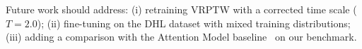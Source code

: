 \documentclass[conference]{IEEEtran}
\begin{document}
Future work should address: (i) retraining VRPTW with a corrected time
scale ($T=2.0$); (ii) fine-tuning on the DHL dataset with mixed training
distributions; (iii) adding a comparison with the Attention Model
baseline~\cite{kool2019attention} on our benchmark.



\end{document}
